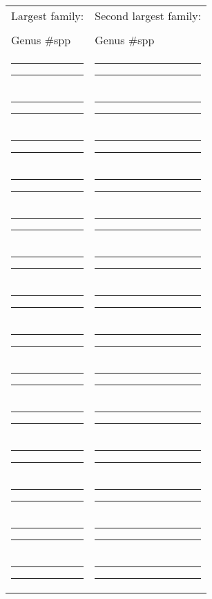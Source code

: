 \documentclass[12pt]{exam}
\begin{document}
{\renewcommand{\arraystretch}{1.35}
\begin{longtable}[l]{@{}ll@{}}
\toprule
Largest family: & Second largest family: \tabularnewline[0.35cm]

\hrulefill & \hrulefill \tabularnewline


Genus \hspace{1.5in} \hfill \#spp & Genus \hspace{1.5in} \#spp \tabularnewline

\rule{1.5in}{0.4pt} \hfill \rule{0.5in}{0.4pt} & \rule{1.5in}{0.4pt} \hfill \rule{0.5in}{0.4pt}  \tabularnewline

\rule{1.5in}{0.4pt} \hfill \rule{0.5in}{0.4pt} & \rule{1.5in}{0.4pt} \hfill \rule{0.5in}{0.4pt}  \tabularnewline

\rule{1.5in}{0.4pt} \hfill \rule{0.5in}{0.4pt} & \rule{1.5in}{0.4pt} \hfill \rule{0.5in}{0.4pt}  \tabularnewline

\rule{1.5in}{0.4pt} \hfill \rule{0.5in}{0.4pt} & \rule{1.5in}{0.4pt} \hfill \rule{0.5in}{0.4pt}  \tabularnewline

\rule{1.5in}{0.4pt} \hfill \rule{0.5in}{0.4pt} & \rule{1.5in}{0.4pt} \hfill \rule{0.5in}{0.4pt}  \tabularnewline

\rule{1.5in}{0.4pt} \hfill \rule{0.5in}{0.4pt} & \rule{1.5in}{0.4pt} \hfill \rule{0.5in}{0.4pt}  \tabularnewline

\rule{1.5in}{0.4pt} \hfill \rule{0.5in}{0.4pt} & \rule{1.5in}{0.4pt} \hfill \rule{0.5in}{0.4pt}  \tabularnewline

\rule{1.5in}{0.4pt} \hfill \rule{0.5in}{0.4pt} & \rule{1.5in}{0.4pt} \hfill \rule{0.5in}{0.4pt}  \tabularnewline

\rule{1.5in}{0.4pt} \hfill \rule{0.5in}{0.4pt} & \rule{1.5in}{0.4pt} \hfill \rule{0.5in}{0.4pt}  \tabularnewline

\rule{1.5in}{0.4pt} \hfill \rule{0.5in}{0.4pt} & \rule{1.5in}{0.4pt} \hfill \rule{0.5in}{0.4pt}  \tabularnewline

\rule{1.5in}{0.4pt} \hfill \rule{0.5in}{0.4pt} & \rule{1.5in}{0.4pt} \hfill \rule{0.5in}{0.4pt}  \tabularnewline

\rule{1.5in}{0.4pt} \hfill \rule{0.5in}{0.4pt} & \rule{1.5in}{0.4pt} \hfill \rule{0.5in}{0.4pt}  \tabularnewline

\rule{1.5in}{0.4pt} \hfill \rule{0.5in}{0.4pt} & \rule{1.5in}{0.4pt} \hfill \rule{0.5in}{0.4pt}  \tabularnewline

\rule{1.5in}{0.4pt} \hfill \rule{0.5in}{0.4pt} & \rule{1.5in}{0.4pt} \hfill \rule{0.5in}{0.4pt}  \tabularnewline


\end{longtable}}
\end{document}

